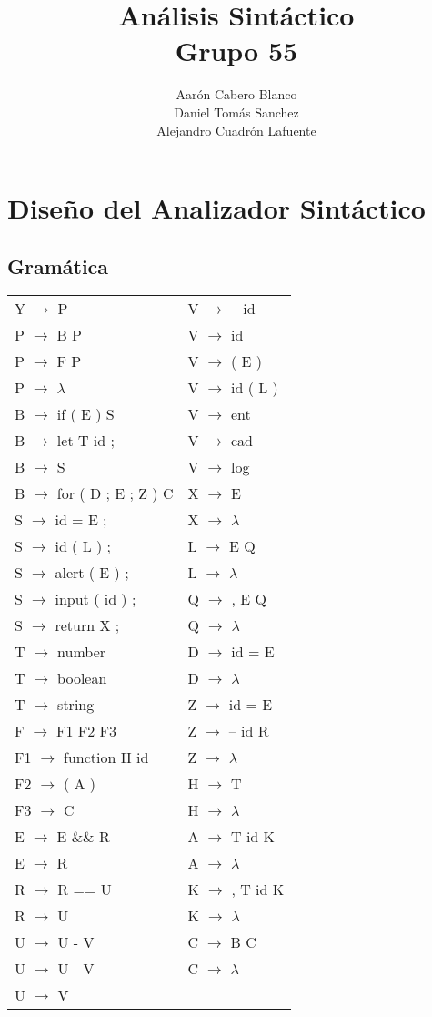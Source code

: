 \documentclass[12pt, a4paper, titlepage]{article}
\title{Análisis Sintáctico \\ \small{Grupo 55}}
\author{Aarón Cabero Blanco \\ Daniel Tomás Sanchez \\ Alejandro Cuadrón Lafuente}
\begin{document}
\maketitle
\tableofcontents

\clearpage


\section{Diseño del Analizador Sintáctico}
\subsection{Gramática}
\label{subsec:grammar}
\noindent
\begin{tabular}{ l l }
  Y $\rightarrow$ P & V $\rightarrow$ -- id \\
  P $\rightarrow$ B P & V $\rightarrow$ id \\
  P $\rightarrow$ F P & V $\rightarrow$ ( E ) \\
  P $\rightarrow$ $\lambda$ & V $\rightarrow$ id ( L ) \\
  B $\rightarrow$ if ( E ) S & V $\rightarrow$ ent \\
  B $\rightarrow$ let T id ; & V $\rightarrow$ cad \\ 
  B $\rightarrow$ S & V $\rightarrow$ log \\
  B $\rightarrow$ for ( D ; E ; Z ) { C } & X $\rightarrow$ E \\
  S $\rightarrow$ id = E ; & X $\rightarrow$ $\lambda$  \\
  S $\rightarrow$ id ( L ) ; & L $\rightarrow$ E Q \\
  S $\rightarrow$ alert ( E ) ; & L $\rightarrow$ $\lambda$ \\
  S $\rightarrow$ input ( id ) ; & Q $\rightarrow$ , E Q\\
  S $\rightarrow$ return X ; & Q $\rightarrow$ $\lambda$ \\
  T $\rightarrow$ number & D $\rightarrow$ id = E \\
  T $\rightarrow$ boolean & D $\rightarrow$ $\lambda$ \\
  T $\rightarrow$ string & Z $\rightarrow$ id = E \\
  F $\rightarrow$ F1 F2 F3 & Z $\rightarrow$ -- id R \\
  F1 $\rightarrow$ function H id & Z $\rightarrow$ $\lambda$ \\
  F2 $\rightarrow$ ( A ) & H $\rightarrow$ T \\
  F3 $\rightarrow$ { C } & H $\rightarrow$ $\lambda$ \\
  E $\rightarrow$ E \&\& R & A $\rightarrow$ T id K \\
  E $\rightarrow$ R & A $\rightarrow$ $\lambda$ \\
  R $\rightarrow$ R == U & K $\rightarrow$ , T id K \\
  R $\rightarrow$ U & K $\rightarrow$ $\lambda$ \\
  U $\rightarrow$ U - V & C $\rightarrow$ B C \\
  U $\rightarrow$ U - V & C $\rightarrow$ $\lambda$ \\
  U $\rightarrow$ V
\end{tabular}
\end{document}
